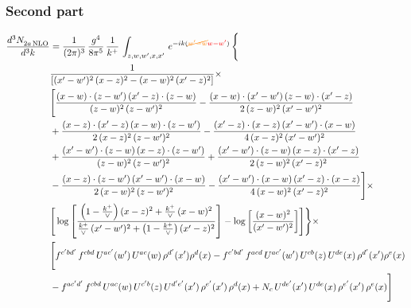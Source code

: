 \documentclass[9pt]{article}
\numberwithin{equation}{section}
\begin{document}
\subsubsection{Second part}
\begin{align}
    \frac{d^{3}N_{2a\,\rm NLO}^{\rm}}{d^{3}k}  & =  \frac{1}{(2\pi)^{3}}\, \frac{g^{4}}{8\pi^{5}}\,\frac{1}{k^{+}}\,\int_{z,w,w^{\prime},x,x'}\, e^{-ik({\color{orange}\cancel{w^{\prime}-w}}{\color{red}w-w^{\prime}})}\, \Bigg\{\notag \\
& \frac{1}{\left[(x'-w')^{2}\, (x-z)^{2}-(x-w)^{2}\, (x'-z)^{2}\right]}\times\,\notag \\ & \Bigg[\frac{(x-w)\cdot (z-w')\, (x'-z)\cdot (z-w)}{(z-w)^{2}\,(z-w')^{2}}-\frac{(x-w)\cdot (x'-w')\, (z-w)\cdot (x'-z)}{2\, (z-w)^{2}\, (x'-w')^{2}}\notag \\ & + \frac{(x-z)\cdot (x'-z)\, (x-w)\cdot (z-w')}{2\, (x-z)^{2}\, (z-w')^{2}}-\frac{(x'-z)\cdot (x-z)\, (x'-w')\cdot (x-w)}{4\, (x-z)^{2}\, (x'-w')^{2}}\notag \\ & + \frac{(x'-w')\cdot (z-w)\, (x-z)\cdot (z-w')}{(z-w)^{2}\,(z-w')^{2}}+\frac{(x'-w')\cdot (z-w)\, (x-z)\cdot (x'-z)}{2\, (z-w)^{2}\, (x'-z)^{2}}\notag \\ & - \frac{(x-z)\cdot (z-w')\, (x'-w')\cdot (x-w)}{2\, (x-w)^{2}\, (z-w')^{2}} -\frac{(x'-w')\cdot (x-w)\, (x'-z)\cdot (x-z)}{4\, (x-w)^{2}\, (x'-z)^{2}}\Bigg]\times\notag \\ &  \Bigg[\log{\left[\frac{\left(1-\frac{k^{+}}{\vee}\right)(x-z)^{2}+\frac{k^{+}}{\vee}\,(x-w)^{2}}{\frac{k^{+}}{\vee}\, (x'-w')^{2} + \left(1-\frac{k^{+}}{\vee}\right) (x'-z)^{2}}\right]}-\log{\left[\frac{(x-w)^{2}}{(x'-w')^{2}}\right]}\Bigg]\Bigg\} \times\, \notag \\ & \Bigg[f^{c'bd'}\,f^{cbd}\, U^{ac'}(w')\,U^{ac}(w)\,\rho^{d'}(x')\rho^{d}(x)- f^{c'bd'}\,f^{acd}\,U^{ac'}(w')\,U^{cb}(z)\,U^{de}(x)\,\rho^{d'}(x')\rho^{e}(x) \notag \\ & -f^{ac'd'}\,f^{cbd}\,U^{ac}(w)\,U^{c'b}(z)\,U^{d'e'}(x')\,\rho^{e'}(x')\,\rho^{d}(x) +N_{c}\,U^{de'}(x')\,U^{de}(x)\,\rho^{e'}(x')\,\rho^{e}(x)\Bigg]
\end{align}
\end{document}
